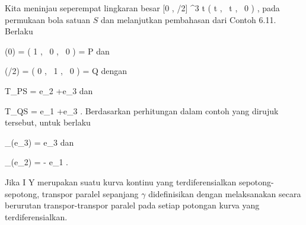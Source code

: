 {

Kita meninjau seperempat lingkaran besar
\maabbeledisp {} {[0 , \pi/2] } { \R^3
} { t } { \left(  \cos  t   , \,   \sin  t  , \,   0                 \right)
} {,}
pada permukaan bola satuan $S$ dan melanjutkan pembahasan dari
Contoh 6.11.
Berlaku

\mavergleichskette
{\vergleichskette
{ \gamma(0)
}
{ = }{ \left(  1   , \,   0  , \,   0                 \right)
}
{ = }{ P
}
{    }{
}
{   }{
}
}
{}{}{}
dan

\mavergleichskette
{\vergleichskette
{ \gamma(\pi/2)
}
{ = }{ \left(  0   , \,   1  , \,   0                 \right)
}
{ = }{ Q
}
{    }{
}
{   }{
}
}
{}{}{}
dengan

\mavergleichskette
{\vergleichskette
{ T_PS
}
{ = }{ \R e_2 +\R e_3
}
{  }{
}
{    }{
}
{   }{
}
}
{}{}{}
dan

\mavergleichskette
{\vergleichskette
{ T_QS
}
{ = }{ \R e_1 +\R e_3
}
{  }{
}
{    }{
}
{   }{
}
}
{}{}{.}
Berdasarkan perhitungan dalam contoh yang dirujuk tersebut, untuk
berlaku

\mavergleichskette
{\vergleichskette
{ \Psi_\gamma(e_3)
}
{ = }{ e_3
}
{  }{
}
{    }{
}
{   }{
}
}
{}{}{}
dan

\mavergleichskette
{\vergleichskette
{ \Psi_\gamma(e_2)
}
{ = }{ - e_1
}
{  }{
}
{    }{
}
{   }{
}
}
{}{}{.}

}

Jika
\maabbdisp {\gamma} { I } { Y
} {}
merupakan suatu kurva kontinu yang terdiferensialkan sepotong-sepotong, transpor paralel sepanjang $\gamma$ didefinisikan dengan melaksanakan secara berurutan transpor-transpor paralel pada setiap potongan kurva yang terdiferensialkan.
